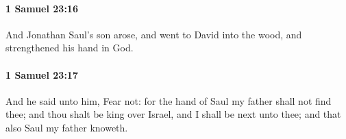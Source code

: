 		\paragraph{1 Samuel 23:16} %
			\label{1SAMUEL-23-16}

			And Jonathan Saul’s son arose, and went to David into the wood, and strengthened his hand in God.


		\paragraph{1 Samuel 23:17} %
			\label{1SAMUEL-23-17}

			And he said unto him, Fear not: for the hand of Saul my father shall not find thee; and thou shalt be king over Israel, and I shall be next unto thee; and that also Saul my father knoweth.


